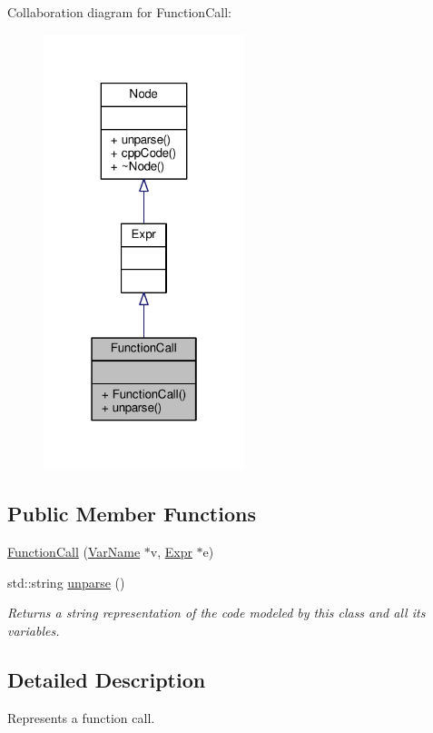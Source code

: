 Collaboration diagram for Function\-Call\-:\nopagebreak
\begin{figure}[H]
\begin{center}
\leavevmode
\includegraphics[width=166pt]{classFunctionCall__coll__graph}
\end{center}
\end{figure}
\subsection*{Public Member Functions}
\begin{DoxyCompactItemize}
\item 
\hyperlink{classFunctionCall_ac233a4d5357e0eeb59ff8a0b9d075d28}{Function\-Call} (\hyperlink{classVarName}{Var\-Name} $\ast$v, \hyperlink{classExpr}{Expr} $\ast$e)
\item 
std\-::string \hyperlink{classFunctionCall_aa80e938636e993ed9956e11a51858b95}{unparse} ()
\begin{DoxyCompactList}\small\item\em Returns a string representation of the code modeled by this class and all its variables. \end{DoxyCompactList}\end{DoxyCompactItemize}


\subsection{Detailed Description}
Represents a function call. \par
 

